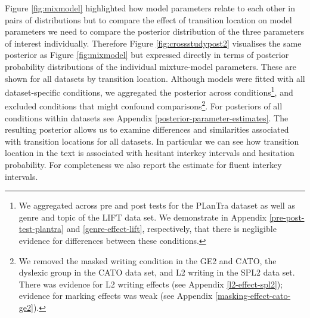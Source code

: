 \documentclass[
  man,floatsintext]{apa7}
\begin{document}
Figure \ref{fig:mixmodel} highlighted how model parameters relate to each other in pairs of distributions but to compare the effect of transition location on model parameters we need to compare the posterior distribution of the three parameters of interest individually. Therefore Figure \ref{fig:crossstudypost2} visualises the same posterior as Figure \ref{fig:mixmodel} but expressed directly in terms of posterior probability distributions of the individual mixture-model parameters. These are shown for all datasets by transition location. Although models were fitted with all dataset-specific conditions, we aggregated the posterior across conditions\footnote{We aggregated across pre and post tests for the PLanTra dataset as well as genre and topic of the LIFT data set. We demonstrate in Appendix \ref{pre-post-test-plantra} and \ref{genre-effect-lift}, respectively, that there is negligible evidence for differences between these conditions.}, and excluded conditions that might confound comparisons\footnote{We removed the masked writing condition in the GE2 and CATO, the dyslexic group in the CATO data set, and L2 writing in the SPL2 data set. There was evidence for L2 writing effects (see Appendix \ref{l2-effect-spl2}); evidence for marking effects was weak (see Appendix \ref{masking-effect-cato-ge2}).}. For posteriors of all conditions within datasets see Appendix \ref{posterior-parameter-estimates}. The resulting posterior allows us to examine differences and similarities associated with transition locations for all datasets. In particular we can see how transition location in the text is associated with hesitant interkey intervals and hesitation probability. For completeness we also report the estimate for fluent interkey intervals.
\end{document}
